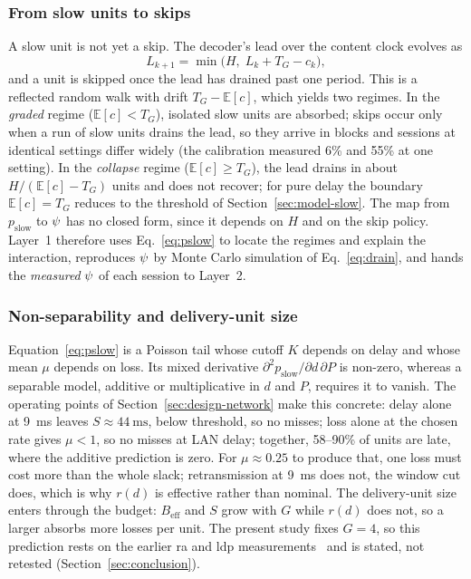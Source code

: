 \subsubsection{From slow units to skips}
\label{sec:model-drain}
A slow unit is not yet a skip. The decoder's lead over the content
clock evolves as
\begin{equation}
  L_{k+1} = \min\big(H,\; L_k + T_G - c_k\big),
  \label{eq:drain}
\end{equation}
and a unit is skipped once the lead has drained past one period. This
is a reflected random walk with drift $T_G - \mathbb{E}[c]$, which
yields two regimes. In the \emph{graded} regime
($\mathbb{E}[c] < T_G$), isolated slow units are absorbed; skips occur
only when a run of slow units drains the lead, so they arrive in blocks
and sessions at identical settings differ widely (the calibration
measured 6\% and 55\% at one setting). In the \emph{collapse} regime
($\mathbb{E}[c] \ge T_G$), the lead drains in about
$H/(\mathbb{E}[c] - T_G)$ units and does not recover; for pure delay
the boundary $\mathbb{E}[c] = T_G$ reduces to the threshold of
Section~\ref{sec:model-slow}. The map from $p_{\mathrm{slow}}$ to
$\psi$ has no closed form, since it depends on $H$ and on the skip
policy. Layer~1 therefore uses Eq.~\eqref{eq:pslow} to locate the
regimes and explain the interaction, reproduces $\psi$ by Monte Carlo
simulation of Eq.~\eqref{eq:drain}, and hands the \emph{measured}
$\psi$ of each session to Layer~2.

\subsubsection{Non-separability and delivery-unit size}
\label{sec:model-interaction}
Equation~\eqref{eq:pslow} is a Poisson tail whose cutoff $K$ depends
on delay and whose mean $\mu$ depends on loss. Its mixed derivative
$\partial^2 p_{\mathrm{slow}}/\partial d\,\partial P$ is non-zero,
whereas a separable model, additive or multiplicative in $d$ and $P$,
requires it to vanish. The operating points of
Section~\ref{sec:design-network} make this concrete: delay alone at
\SI{9}{\milli\second} leaves $S \approx \SI{44}{\milli\second}$, below
threshold, so no misses; loss alone at the chosen rate gives
$\mu < 1$, so no misses at LAN delay; together, 58--90\% of units are
late, where the additive prediction is zero. For $\mu \approx 0.25$ to
produce that, one loss must cost more than the whole slack;
retransmission at \SI{9}{\milli\second} does not, the window cut does,
which is why $r(d)$ is effective rather than nominal. The delivery-unit
size enters through the budget: $B_{\mathrm{eff}}$ and $S$ grow with
$G$ while $r(d)$ does not, so a larger \gof absorbs more losses per
unit. The present study fixes $G = 4$, so this prediction rests on the
earlier \gls{ra} and \gls{ldp} measurements~\cite{mosaic2026} and is
stated, not retested (Section~\ref{sec:conclusion}).

